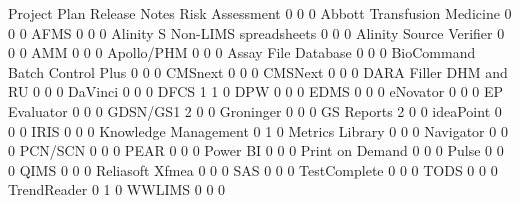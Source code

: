 \documentclass{article}
\begin{document}
\begin{Schunk}
\begin{Soutput}
                                  Project Plan Release Notes Risk Assessment
                                             0             0               0
  Abbott Transfusion Medicine                0             0               0
  AFMS                                       0             0               0
  Alinity S Non-LIMS spreadsheets            0             0               0
  Alinity Source Verifier                    0             0               0
  AMM                                        0             0               0
  Apollo/PHM                                 0             0               0
  Assay File Database                        0             0               0
  BioCommand Batch Control Plus              0             0               0
  CMSnext                                    0             0               0
  CMSNext                                    0             0               0
  DARA Filler DHM and RU                     0             0               0
  DaVinci                                    0             0               0
  DFCS                                       1             1               0
  DPW                                        0             0               0
  EDMS                                       0             0               0
  eNovator                                   0             0               0
  EP Evaluator                               0             0               0
  GDSN/GS1                                   2             0               0
  Groninger                                  0             0               0
  GS Reports                                 2             0               0
  ideaPoint                                  0             0               0
  IRIS                                       0             0               0
  Knowledge Management                       0             1               0
  Metrics Library                            0             0               0
  Navigator                                  0             0               0
  PCN/SCN                                    0             0               0
  PEAR                                       0             0               0
  Power BI                                   0             0               0
  Print on Demand                            0             0               0
  Pulse                                      0             0               0
  QIMS                                       0             0               0
  Reliasoft Xfmea                            0             0               0
  SAS                                        0             0               0
  TestComplete                               0             0               0
  TODS                                       0             0               0
  TrendReader                                0             1               0
  WWLIMS                                     0             0               0
                                 

\end{Soutput}
\end{Schunk}
\end{document}
